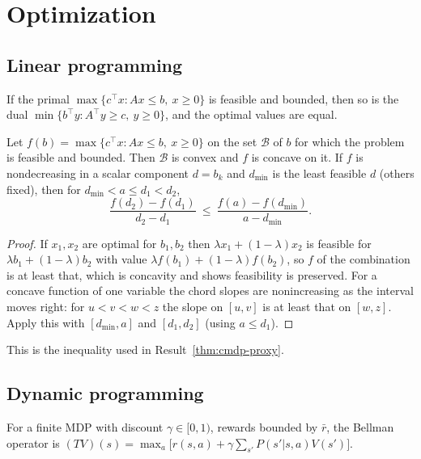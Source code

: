 \chapter{Optimization}\label{app:opt}

\section{Linear programming}

\begin{established}\label{e:duality}
If the primal $\max\{c^\top x:Ax\le b,\ x\ge0\}$ is feasible and bounded, then so is the dual $\min\{b^\top y:A^\top y\ge c,\ y\ge0\}$, and the optimal values are equal.
\end{established}

\begin{newresult}\label{e:concave}
Let $f(b)=\max\{c^\top x:Ax\le b,\ x\ge0\}$ on the set $\mathcal B$ of $b$ for which the problem is feasible and bounded. Then $\mathcal B$ is convex and $f$ is concave on it. If $f$ is nondecreasing in a scalar component $d=b_k$ and $d_{\min}$ is the least feasible $d$ (others fixed), then for $d_{\min}<a\le d_1<d_2$,
\[
\frac{f(d_2)-f(d_1)}{d_2-d_1}\ \le\ \frac{f(a)-f(d_{\min})}{a-d_{\min}} .
\]
\end{newresult}
\begin{proof}
If $x_1,x_2$ are optimal for $b_1,b_2$ then $\lambda x_1+(1-\lambda)x_2$ is feasible for $\lambda b_1+(1-\lambda)b_2$ with value $\lambda f(b_1)+(1-\lambda)f(b_2)$, so $f$ of the combination is at least that, which is concavity and shows feasibility is preserved. For a concave function of one variable the chord slopes are nonincreasing as the interval moves right: for $u<v<w<z$ the slope on $[u,v]$ is at least that on $[w,z]$. Apply this with $[d_{\min},a]$ and $[d_1,d_2]$ (using $a\le d_1$).
\end{proof}

This is the inequality used in Result~\ref{thm:cmdp-proxy}.

\section{Dynamic programming}

For a finite MDP with discount $\gamma\in[0,1)$, rewards bounded by $\bar r$, the Bellman operator is $(TV)(s)=\max_a\bigl[r(s,a)+\gamma\sum_{s'}P(s'|s,a)V(s')\bigr]$.

